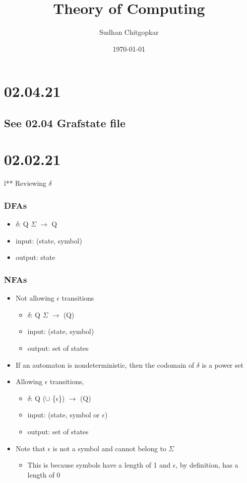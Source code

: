 \documentclass[11pt]{article}
\author{Sudhan Chitgopkar}
\date{\today}
\title{Theory of Computing}
\begin{document}
\maketitle
\section*{02.04.21}
\label{sec:org148c746}
\subsection*{See 02.04 Grafstate file}
\label{sec:org8b55dab}
\section*{02.02.21}
\label{sec:orgc3b6292}
l** Reviewing \(\delta\)
\subsubsection*{DFAs}
\label{sec:org052de37}
\begin{itemize}
\item \(\delta\): Q \texttimes{} \(\Sigma\) \(\to\) Q
\item input: (state, symbol)
\item output: state
\end{itemize}
\subsubsection*{NFAs}
\label{sec:org81d4451}
\begin{itemize}
\item Not allowing \(\epsilon\) transitions
\begin{itemize}
\item \(\delta\): Q \texttimes{} \(\Sigma\) \(\to\) \powerset(Q)
\item input: (state, symbol)
\item output: set of states
\end{itemize}
\item If an automaton is nondeterministic, then the codomain of \(\delta\) is a power set
\item Allowing \(\epsilon\) transitions,
\begin{itemize}
\item \(\delta\): Q \texttimes{} (\Simga \(\cup\) \{\(\epsilon\)\}) \(\to\) \powerset(Q)
\item input: (state, symbol or \(\epsilon\))
\item output: set of states
\end{itemize}
\item Note that \(\epsilon\) is not a symbol and cannot belong to \(\Sigma\)
\begin{itemize}
\item This is because symbols have a length of 1 and \(\epsilon\), by definition, has a length of 0
\end{itemize}
\end{itemize}
\end{document}
